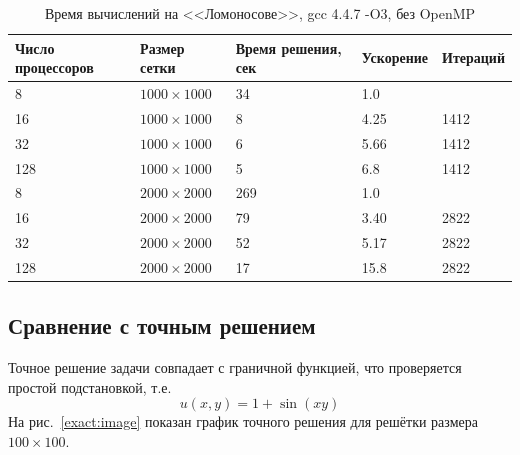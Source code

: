 \documentclass[12pt,notitlepage,oneside]{extarticle}
\begin{document}
\begin{table}[h]
\centering
\caption{Время вычислений на <<Ломоносове>>, gcc 4.4.7 -O3, без OpenMP}
\label{lom_gcc:table}
\begin{tabular}{|l|l|l|l|l|}
\textbf{Число процессоров} & \textbf{Размер сетки} & \textbf{Время решения, сек} & \textbf{Ускорение} & \textbf{Итераций}      \\  \hline
8                          & $1000 \times 1000 $        & 34                            &   1.0                 &                        \\
16                         & $1000 \times 1000 $        & 8                          & 4.25                   & 1412                   \\
32                         & $1000 \times 1000 $        & 6                          & 5.66                   & 1412                   \\
128                        & $1000 \times 1000 $        & 5                         & 6.8                   & 1412                   \\ \hline
8                          & $2000 \times 2000 $        & 269                            & 1.0                   &                        \\
16                         & $2000 \times 2000 $        & 79                         & 3.40                   & 2822                   \\
32                         & $2000 \times 2000 $        & 52                         & 5.17                   & 2822                   \\
128                        & $2000 \times 2000 $        & 17                          & 15.8                   & 2822
\end{tabular}
\end{table}

\subsection{Сравнение с точным решением}
Точное решение задачи совпадает с граничной функцией, что проверяется простой
подстановкой, т.е.
\[
  u(x, y) = 1 + \sin(xy)
\]
На рис.~\ref{exact:image} показан график точного решения для решётки размера
$100 \times 100$.
\end{document}
